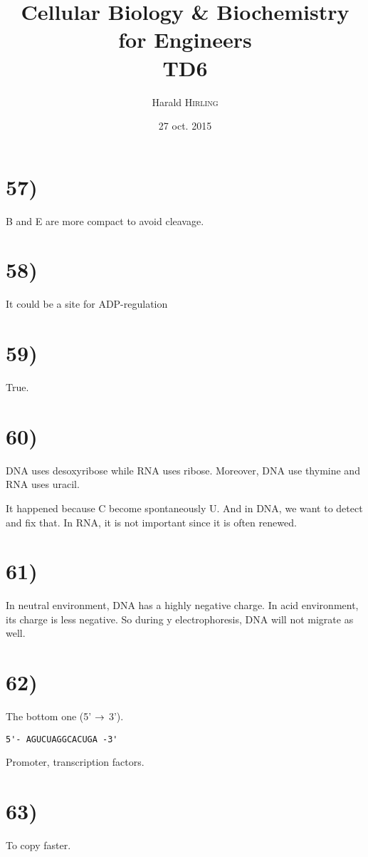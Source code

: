 

\title{Cellular Biology \& Biochemistry for Engineers\\TD6}
\author{Harald \textsc{Hirling}}
\date{27 oct. 2015}


\maketitle

\section*{57)}
B and E are more compact to avoid cleavage.

\section*{58)}
It could be a site for ADP-regulation

\section*{59)}
True.

\section*{60)}
DNA uses desoxyribose while RNA uses ribose. Moreover, DNA use thymine and RNA uses uracil.

It happened because C become spontaneously U. And in DNA, we want to detect and fix that. In RNA, it is not important since it is often renewed.

\section*{61)}
In neutral environment, DNA has a highly negative charge. In acid environment, its charge is less negative. So during y electrophoresis, DNA will not migrate as well.

\section*{62)}
The bottom one (5' $\rightarrow$ 3').

\begin{verbatim}
5'- AGUCUAGGCACUGA -3'
\end{verbatim}

Promoter, transcription factors.

\section*{63)}
To copy faster.

